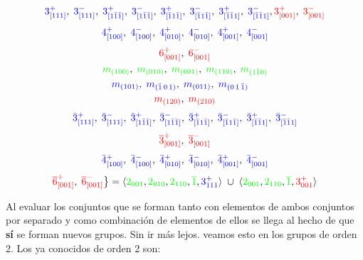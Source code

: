 \documentclass{report}
\begin{document}
\[\textcolor{blue}{3^{+}_{[111]}},\;\textcolor{blue}{3^{-}_{[111]}},
\;\textcolor{blue}{3^{+}_{[1\bar{1}\bar{1}]}},\;\textcolor{blue}{3^{-}_{[1\bar{1}\bar{1}]}},
\;\textcolor{blue}{3^{+}_{[\bar{1}1\bar{1}]}},\;\textcolor{blue}{3^{-}_{[\bar{1}1\bar{1}]}},
\;\textcolor{blue}{3^{+}_{[\bar{1}\bar{1}1]}},\;\textcolor{blue}{3^{-}_{[\bar{1}\bar{1}1]}},
\textcolor{red}{3^{+}_{[001]}},\;\textcolor{red}{3^{-}_{[001]}}
\]
 \[\textcolor{blue}{4^{+}_{[100]}},\;\textcolor{blue}{4^{-}_{[100]}},
\;\textcolor{blue}{4^{+}_{[010]}},\;\textcolor{blue}{4^{-}_{[010]}},
\;\textcolor{blue}{4^{+}_{[001]}},\;\textcolor{blue}{4^{-}_{[001]}}\]      
\[\textcolor{red}{6^{+}_{[001]}},\;\textcolor{red}{6^{-}_{[001]}}\]
\[\textcolor{green}{m_{(100)}},\;\textcolor{green}{m_{(010)}},\;\textcolor{green}{m_{(001)}},
\;\textcolor{green}{m_{(110)}},\;\textcolor{green}{m_{(1\bar{1}0)}}\]
\[\textcolor{blue}{m_{(101)}},\;\textcolor{blue}{m_{(\bar{1}\,0\,1)}},
\;\textcolor{blue}{m_{(011)}},\;\textcolor{blue}{m_{(0\,1\,\bar{1})}}\quad\]
\[\textcolor{red}{m_{(120)}},\;\textcolor{red}{m_{(210)}}\]
\[\textcolor{blue}{\bar{3}^{+}_{[111]}},\;\textcolor{blue}{\bar{3}^{-}_{[111]}},
\;\textcolor{blue}{\bar{3}^{+}_{[1\bar{1}\bar{1}]}},\;\textcolor{blue}{\bar{3}^{-}_{[1\bar{1}\bar{1}]}},
\;\textcolor{blue}{\bar{3}^{+}_{[\bar{1}1\bar{1}]}},\;\textcolor{blue}{\bar{3}^{-}_{[\bar{1}1\bar{1}]}},
\;\textcolor{blue}{\bar{3}^{+}_{[\bar{1}\bar{1}1]}},\;\textcolor{blue}{\bar{3}^{-}_{[\bar{1}\bar{1}1]}}\]
\[\textcolor{red}{\overline{3}^{+}_{[001]}},\;\textcolor{red}{\overline{3}^{-}_{[001]}}\]
\[\textcolor{blue}{\bar{4}^{+}_{[100]}},\;\textcolor{blue}{\bar{4}^{-}_{[100]}},
\;\textcolor{blue}{\bar{4}^{+}_{[010]}},\;\textcolor{blue}{\bar{4}^{-}_{[010]}},
\;\textcolor{blue}{\bar{4}^{+}_{[001]}},\;\textcolor{blue}{\bar{4}^{-}_{[001]}}\]
\[\textcolor{red}{\overline{6}^{+}_{[001]}},\;\textcolor{red}{\overline{6}^{-}_{[001]}}
\bigr\}=\langle \textcolor{green}{2_{001}},\textcolor{green}{2_{010}},\textcolor{green}{2_{110}},\textcolor{green}{\overline{1}},\textcolor{blue}{3^+_{111}}  \rangle \;\cup \; \langle \textcolor{green}{2_{001}},\textcolor{green}{2_{110}},\textcolor{green}{\overline{1}},\textcolor{red}{3^+_{001}}  \rangle \]





\newpage


Al evaluar los conjuntos que se forman tanto con elementos de ambos conjuntos por separado y como combinación de elementos de ellos se llega al hecho de que \textbf{sí}  se forman nuevos grupos. Sin ir más lejos. veamos esto en los grupos de orden 2. Los ya conocidos de orden 2 son:
\end{document}
